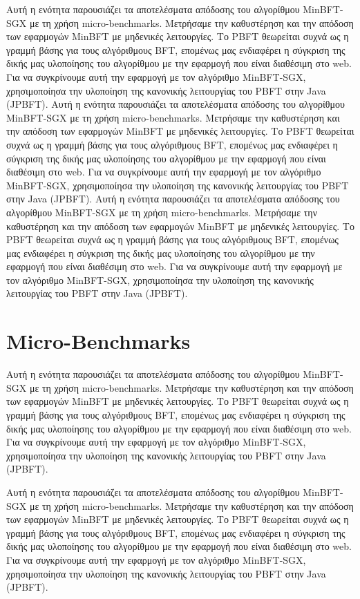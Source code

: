 Αυτή η ενότητα παρουσιάζει τα αποτελέσματα απόδοσης του αλγορίθμου MinBFT-SGX με τη χρήση micro-benchmarks. Μετρήσαμε την καθυστέρηση και την απόδοση των εφαρμογών MinBFT με μηδενικές λειτουργίες. Το PBFT θεωρείται συχνά ως η γραμμή βάσης για τους αλγόριθμους BFT, επομένως μας ενδιαφέρει η σύγκριση της δικής μας υλοποίησης του αλγορίθμου με την εφαρμογή που είναι διαθέσιμη στο web. Για να συγκρίνουμε αυτή την εφαρμογή με τον αλγόριθμο MinBFT-SGX, χρησιμοποίησα την υλοποίηση της κανονικής λειτουργίας του PBFT στην Java (JPBFT).
Αυτή η ενότητα παρουσιάζει τα αποτελέσματα απόδοσης του αλγορίθμου MinBFT-SGX με τη χρήση micro-benchmarks. Μετρήσαμε την καθυστέρηση και την απόδοση των εφαρμογών MinBFT με μηδενικές λειτουργίες. Το PBFT θεωρείται συχνά ως η γραμμή βάσης για τους αλγόριθμους BFT, επομένως μας ενδιαφέρει η σύγκριση της δικής μας υλοποίησης του αλγορίθμου με την εφαρμογή που είναι διαθέσιμη στο web. Για να συγκρίνουμε αυτή την εφαρμογή με τον αλγόριθμο MinBFT-SGX, χρησιμοποίησα την υλοποίηση της κανονικής λειτουργίας του PBFT στην Java (JPBFT).
Αυτή η ενότητα παρουσιάζει τα αποτελέσματα απόδοσης του αλγορίθμου MinBFT-SGX με τη χρήση micro-benchmarks. Μετρήσαμε την καθυστέρηση και την απόδοση των εφαρμογών MinBFT με μηδενικές λειτουργίες. Το PBFT θεωρείται συχνά ως η γραμμή βάσης για τους αλγόριθμους BFT, επομένως μας ενδιαφέρει η σύγκριση της δικής μας υλοποίησης του αλγορίθμου με την εφαρμογή που είναι διαθέσιμη στο web. Για να συγκρίνουμε αυτή την εφαρμογή με τον αλγόριθμο MinBFT-SGX, χρησιμοποίησα την υλοποίηση της κανονικής λειτουργίας του PBFT στην Java (JPBFT).

\section{Micro-Benchmarks}
Αυτή η ενότητα παρουσιάζει τα αποτελέσματα απόδοσης του αλγορίθμου MinBFT-SGX με τη χρήση micro-benchmarks. Μετρήσαμε την καθυστέρηση και την απόδοση των εφαρμογών MinBFT με μηδενικές λειτουργίες. Το PBFT θεωρείται συχνά ως η γραμμή βάσης για τους αλγόριθμους BFT, επομένως μας ενδιαφέρει η σύγκριση της δικής μας υλοποίησης του αλγορίθμου με την εφαρμογή που είναι διαθέσιμη στο web. Για να συγκρίνουμε αυτή την εφαρμογή με τον αλγόριθμο MinBFT-SGX, χρησιμοποίησα την υλοποίηση της κανονικής λειτουργίας του PBFT στην Java (JPBFT).

Αυτή η ενότητα παρουσιάζει τα αποτελέσματα απόδοσης του αλγορίθμου MinBFT-SGX με τη χρήση micro-benchmarks. Μετρήσαμε την καθυστέρηση και την απόδοση των εφαρμογών MinBFT με μηδενικές λειτουργίες. Το PBFT θεωρείται συχνά ως η γραμμή βάσης για τους αλγόριθμους BFT, επομένως μας ενδιαφέρει η σύγκριση της δικής μας υλοποίησης του αλγορίθμου με την εφαρμογή που είναι διαθέσιμη στο web. Για να συγκρίνουμε αυτή την εφαρμογή με τον αλγόριθμο MinBFT-SGX, χρησιμοποίησα την υλοποίηση της κανονικής λειτουργίας του PBFT στην Java (JPBFT).

